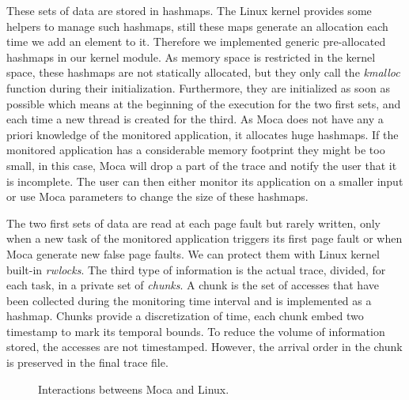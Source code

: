 These sets of data are stored in hashmaps.
The \gls{Linux} kernel provides some helpers to manage such hashmaps, still these maps generate an allocation each time we add an element to it.
Therefore we implemented generic pre-allocated hashmaps in our kernel module.
As memory space is restricted in the kernel space, these hashmaps are not statically allocated, but they only call the \emph{kmalloc} function during their initialization.
Furthermore, they are initialized as soon as possible which means at the beginning of the execution for the two first sets, and each time a new thread is created for the third.
As \gls{Moca} does not have any a priori knowledge of the monitored application, it allocates huge hashmaps.
If the monitored application has a considerable memory footprint they might be too small, in this case, \gls{Moca} will drop a part of the trace and notify the user that it is incomplete.
The user can then either monitor its application on a smaller input or  use \gls{Moca} parameters to change the size of these hashmaps.

The two first sets of data are read at each page fault but rarely written, only when a new task of the monitored application triggers its first page fault or when \gls{Moca} generate new false page faults.
We can protect them with Linux kernel built-in \emph{rwlocks}.
The third type of information is the actual trace, divided, for each task, in a private set of \emph{chunks}.
A chunk is the set of accesses that have been collected during the monitoring time interval and is implemented as a hashmap.
Chunks provide a discretization of time, each chunk embed two timestamp to mark its temporal bounds.
To reduce the volume of information stored, the accesses are not timestamped.
However, the arrival order in the chunk is preserved in the final trace file.

\begin{figure}[htb]
    \centering
    
    \caption{Interactions betweens Moca and Linux.}
    \label{fig:moca}
\end{figure}

